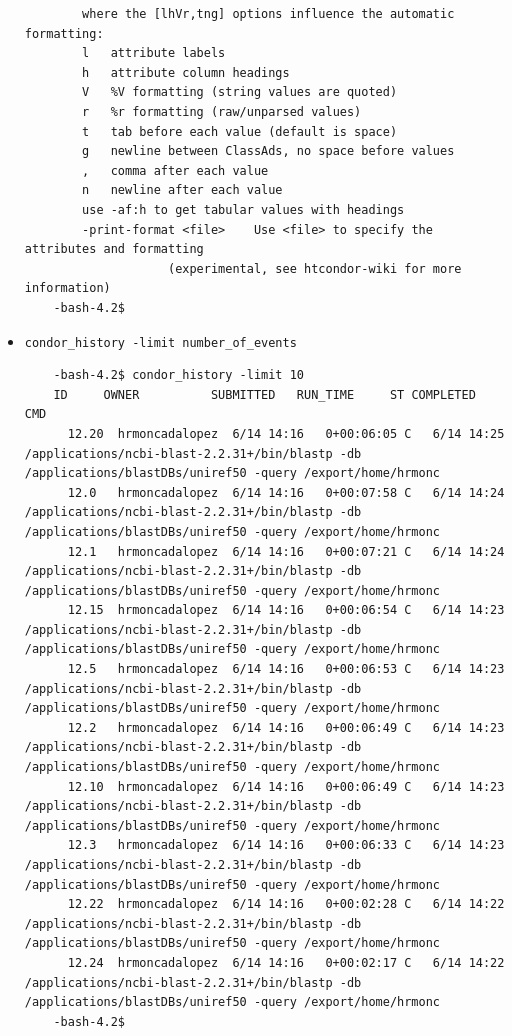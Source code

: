 \documentclass{article}
\begin{document}
\begin{itemize}
\begin{verbatim}
		where the [lhVr,tng] options influence the automatic formatting:
		l	attribute labels
		h	attribute column headings
		V	%V formatting (string values are quoted)
		r	%r formatting (raw/unparsed values)
		t	tab before each value (default is space)
		g	newline between ClassAds, no space before values
		,	comma after each value
		n	newline after each value
		use -af:h to get tabular values with headings
	    -print-format <file>	Use <file> to specify the attributes and formatting
				    (experimental, see htcondor-wiki for more information)
    -bash-4.2$
\end{verbatim}
\normalsize
\item \verb+condor_history -limit number_of_events+
\tiny
\begin{verbatim}
    -bash-4.2$ condor_history -limit 10
    ID     OWNER          SUBMITTED   RUN_TIME     ST COMPLETED   CMD            
      12.20  hrmoncadalopez  6/14 14:16   0+00:06:05 C   6/14 14:25 /applications/ncbi-blast-2.2.31+/bin/blastp -db /applications/blastDBs/uniref50 -query /export/home/hrmonc
      12.0   hrmoncadalopez  6/14 14:16   0+00:07:58 C   6/14 14:24 /applications/ncbi-blast-2.2.31+/bin/blastp -db /applications/blastDBs/uniref50 -query /export/home/hrmonc
      12.1   hrmoncadalopez  6/14 14:16   0+00:07:21 C   6/14 14:24 /applications/ncbi-blast-2.2.31+/bin/blastp -db /applications/blastDBs/uniref50 -query /export/home/hrmonc
      12.15  hrmoncadalopez  6/14 14:16   0+00:06:54 C   6/14 14:23 /applications/ncbi-blast-2.2.31+/bin/blastp -db /applications/blastDBs/uniref50 -query /export/home/hrmonc
      12.5   hrmoncadalopez  6/14 14:16   0+00:06:53 C   6/14 14:23 /applications/ncbi-blast-2.2.31+/bin/blastp -db /applications/blastDBs/uniref50 -query /export/home/hrmonc
      12.2   hrmoncadalopez  6/14 14:16   0+00:06:49 C   6/14 14:23 /applications/ncbi-blast-2.2.31+/bin/blastp -db /applications/blastDBs/uniref50 -query /export/home/hrmonc
      12.10  hrmoncadalopez  6/14 14:16   0+00:06:49 C   6/14 14:23 /applications/ncbi-blast-2.2.31+/bin/blastp -db /applications/blastDBs/uniref50 -query /export/home/hrmonc
      12.3   hrmoncadalopez  6/14 14:16   0+00:06:33 C   6/14 14:23 /applications/ncbi-blast-2.2.31+/bin/blastp -db /applications/blastDBs/uniref50 -query /export/home/hrmonc
      12.22  hrmoncadalopez  6/14 14:16   0+00:02:28 C   6/14 14:22 /applications/ncbi-blast-2.2.31+/bin/blastp -db /applications/blastDBs/uniref50 -query /export/home/hrmonc
      12.24  hrmoncadalopez  6/14 14:16   0+00:02:17 C   6/14 14:22 /applications/ncbi-blast-2.2.31+/bin/blastp -db /applications/blastDBs/uniref50 -query /export/home/hrmonc
    -bash-4.2$ 
\end{verbatim}
\normalsize


\end{itemize}
\end{document}
